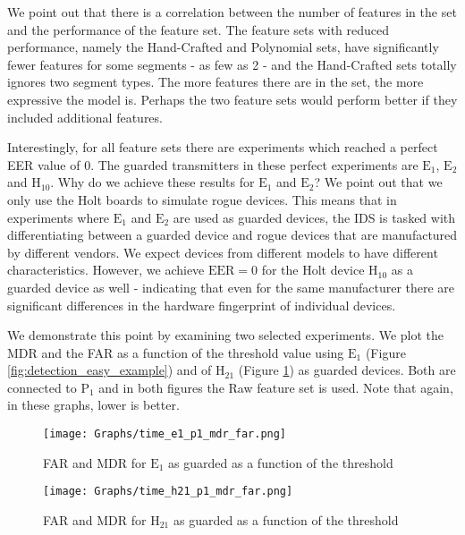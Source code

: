 \documentclass[compsoc,conference,a4paper]{IEEEtran}
\begin{document}
  We point out that there is a correlation between the number of features in the set and the performance of the feature set. The feature sets with reduced performance, namely the Hand-Crafted and Polynomial sets, have significantly fewer features for some segments - as few as 2 - and the Hand-Crafted sets totally ignores two segment types. The more features there are in the set, the more expressive the model is. Perhaps the two feature sets would perform better if they included additional features.
  
  Interestingly, for all feature sets there are experiments which reached a perfect EER value of 0. The guarded transmitters in these perfect experiments are \(\text{E}_1\), \(\text{E}_2\) and \(\text{H}_{10}\). Why do we achieve these results for \(\text{E}_1\) and \(\text{E}_2\)? We point out that we only use the Holt boards to simulate rogue devices. This means that in experiments where \(\text{E}_1\) and \(\text{E}_2\) are used as guarded devices, the IDS is tasked with differentiating between a guarded device and rogue devices that are manufactured by different vendors. We expect devices from different models to have different characteristics. However, we achieve \(\text{EER}=0\) for the Holt device \(\text{H}_{10}\) as a guarded device as well - indicating that even for the same manufacturer there are significant differences in the hardware fingerprint of individual devices.
  
  We demonstrate this point by examining two selected experiments. We plot the MDR and the FAR as a function of the threshold value using \(\text{E}_1\) (Figure \ref{fig:detection_easy_example}) and of \(\text{H}_{21}\) (Figure \ref{fig:detection_difficult_example}) as guarded devices. Both are connected to \(\text{P}_1\) and in both figures the Raw feature set is used. Note that again, in these graphs, lower is better.
  
  \begin{figure}[t]
    \centering
    \texttt{[image: Graphs/time\_e1\_p1\_mdr\_far.png]}
    \caption{FAR and MDR for \(\text{E}_1\) as guarded as a function of the threshold}
    \label{fig:detection_easy_example}
  
    \texttt{[image: Graphs/time\_h21\_p1\_mdr\_far.png]}
    \caption{FAR and MDR for \(\text{H}_{21}\) as guarded as a function of the threshold}
    \label{fig:detection_difficult_example}
  \end{figure}
  
\end{document}
